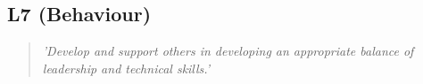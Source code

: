 \subsection{L7 (Behaviour)}

  \begin{quote}
    \textit{'Develop and support others in
    developing an appropriate balance of leadership and
    technical skills.'}
  \end{quote}

\newpage